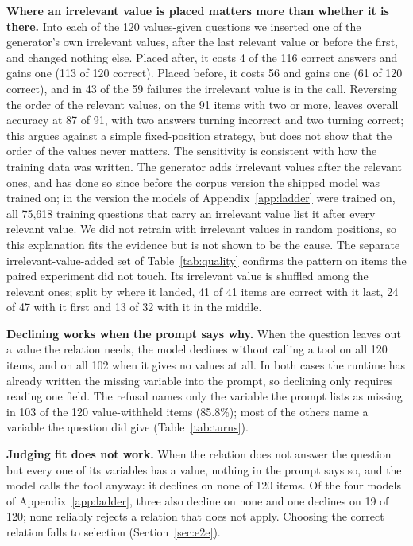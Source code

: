 \documentclass[10pt]{article}
\begin{document}
\textbf{Where an irrelevant value is placed matters more than whether it is there.} Into each of the
120 values-given questions we inserted one of the generator's own irrelevant values, after the last
relevant value or before the first, and changed nothing else. Placed after, it costs 4 of the 116
correct answers and gains one (113 of 120 correct). Placed before, it costs 56 and gains one
(61 of 120 correct), and in 43 of the 59 failures the irrelevant value is in the call. Reversing the
order of the relevant values, on the 91 items with two or more, leaves overall accuracy at 87 of 91,
with two answers turning incorrect and two turning correct; this argues against a simple fixed-position
strategy, but does not show that the order of the values never matters. The sensitivity is consistent
with how the training data was written. The generator adds irrelevant values after the relevant ones,
and has done so since before the corpus version the shipped model was trained on; in the version the
models of Appendix~\ref{app:ladder} were trained on, all 75,618 training questions that carry an
irrelevant value list it after every relevant value. We did not retrain with irrelevant values in
random positions, so this explanation fits the evidence but is not shown to be the cause. The separate
irrelevant-value-added set of Table~\ref{tab:quality} confirms the pattern on items the paired experiment
did not touch. Its irrelevant value is shuffled among the relevant ones; split by where it landed,
41 of 41 items are correct with it last, 24 of 47 with it first and 13 of 32 with it in the middle.

\textbf{Declining works when the prompt says why.} When the question leaves out a value the relation
needs, the model declines without calling a tool on all 120 items, and on all 102 when it gives no
values at all. In both cases the runtime has already written the missing variable into the prompt,
so declining only requires reading one field. The refusal names only the variable the prompt lists
as missing in 103 of the 120 value-withheld items (85.8\%); most of the others name a variable the
question did give (Table~\ref{tab:turns}).

\textbf{Judging fit does not work.} When the relation does not answer the question but every one of
its variables has a value, nothing in the prompt says so, and the model calls the tool anyway: it
declines on none of 120 items. Of the four models of Appendix~\ref{app:ladder}, three also decline
on none and one declines on 19 of 120; none reliably rejects a relation that does not apply.
Choosing the correct relation falls to selection (Section~\ref{sec:e2e}).
\end{document}
